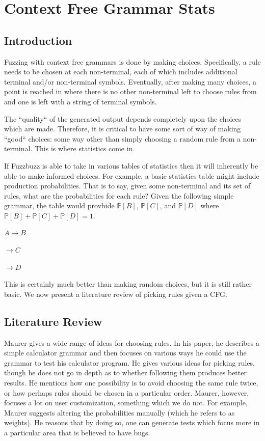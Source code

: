 \section{Context Free Grammar Stats}
\subsection{Introduction}
Fuzzing with context free grammars is done by making choices. Specifically, a
rule needs to be chosen at each non-terminal, each of which includes additional
terminal and/or non-terminal symbols. Eventually, after making many choices, a
point is reached in where there is no other non-terminal left to choose rules
from and one is left with a string of terminal symbols.

The ``quality`` of the generated output depends completely upon the choices
which are made. Therefore, it is critical to have some sort of way of making
``good`` choices: some way other than simply choosing a random rule from a
non-terminal. This is where statistics come in.

If Fuzzbuzz is able to take in various tables of statistics then it will
inherently be able to make informed choices. For example, a basic statistics
table might include production probabilities. That is to say, given some
non-terminal and its set of rules, what are the probabilities for each rule?
Given the following simple grammar, the table would provbide $\mathbb{P}[B]$,
$\mathbb{P}[C]$, and $\mathbb{P}[D]$ where $\mathbb{P}[B] + \mathbb{P}[C] +
\mathbb{P}[D] = 1$.

\begin{center}
$A \rightarrow B$
\end{center}
\begin{center}
$\rightarrow C$
\end{center}
\begin{center}
$\rightarrow D$
\end{center}

This is certainly much better than making random choices, but it is still
rather basic. We now present a literature review of picking rules given a CFG.

\subsection{Literature Review}

Maurer\cite{Maurer1990} gives a wide range of ideas for choosing rules. In his
paper, he describes a simple calculator grammar and then focuses on various
ways he could use the grammar to test his calculator program. He gives various
ideas for picking rules, though he does not go in depth as to whether following
them produces better results. He mentions how one possibility is to avoid
choosing the same rule twice, or how perhaps rules should be chosen in a
particular order. Maurer, however, focuses a lot on user customization,
something which we do not. For example, Maurer suggests altering the
probabilities manually (which he refers to as weights). He reasons that by
doing so, one can generate tests which focus more in a particular area that is
believed to have bugs.

